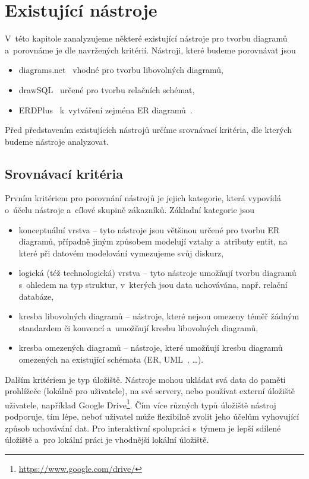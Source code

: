 \chapter{Existující nástroje}

V~této kapitole zanalyzujeme některé existující nástroje pro tvorbu diagramů a~porovnáme je dle navržených kritérií.
Nástroji, které budeme porovnávat jsou
\begin{itemize}
  \item diagrams.net~\cite{diagramsnet21} vhodné pro tvorbu libovolných diagramů,
  \item drawSQL~\cite{drawsql21} určené pro tvorbu relačních schémat,
  \item ERDPlus~\cite{erdplus21} k~vytváření zejména ER diagramů~\cite{Chen76}.
\end{itemize}

Před představením existujících nástrojů určíme srovnávací kritéria, dle kterých budeme nástroje analyzovat.

\section{Srovnávací kritéria}

Prvním kritériem pro porovnání nástrojů je jejich kategorie, která vypovídá o~účelu nástroje a~cílové skupině zákazníků.
Základní kategorie jsou
\begin{itemize}
  \item konceptuální vrstva -- tyto nástroje jsou většinou určené pro tvorbu ER diagramů, případně jiným způsobem modelují vztahy a~atributy entit, na které při datovém modelování vymezujeme svůj diskurz,
  \item logická (též technologická) vrstva -- tyto nástroje umožňují tvorbu diagramů s~ohledem na typ struktur, v~kterých jsou data uchovávána, např. relační databáze,
  \item kresba libovolných diagramů -- nástroje, které nejsou omezeny téměř žádným standardem či konvencí a~umožňují kresbu libovolných diagramů,
  \item kresba omezených diagramů -- nástroje, které umožňují kresbu diagramů omezených na existující schémata (ER, UML~\cite{uml2017}, \dots).
\end{itemize}

Dalším kritériem je typ úložiště.
Nástroje mohou ukládat svá data do paměti prohlížeče (lokálně pro uživatele), na své servery, nebo používat externí úložiště uživatele, například Google Drive\footnote{\url{https://www.google.com/drive/}}.
Čím více různých typů úložiště nástroj podporuje, tím lépe, neboť uživatel může flexibilně zvolit jeho účelům vyhovující způsob uchovávání dat.
Pro interaktivní spolupráci s~týmem je lepší sdílené úložiště a~pro lokální práci je vhodnější lokální úložiště.

